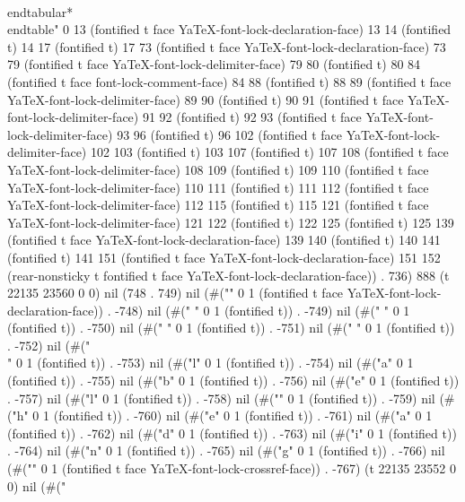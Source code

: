 {   \\end{tabular*}
 \\end{table}" 0 13 (fontified t face YaTeX-font-lock-declaration-face) 13 14 (fontified t) 14 17 (fontified t) 17 73 (fontified t face YaTeX-font-lock-declaration-face) 73 79 (fontified t face YaTeX-font-lock-delimiter-face) 79 80 (fontified t) 80 84 (fontified t face font-lock-comment-face) 84 88 (fontified t) 88 89 (fontified t face YaTeX-font-lock-delimiter-face) 89 90 (fontified t) 90 91 (fontified t face YaTeX-font-lock-delimiter-face) 91 92 (fontified t) 92 93 (fontified t face YaTeX-font-lock-delimiter-face) 93 96 (fontified t) 96 102 (fontified t face YaTeX-font-lock-delimiter-face) 102 103 (fontified t) 103 107 (fontified t) 107 108 (fontified t face YaTeX-font-lock-delimiter-face) 108 109 (fontified t) 109 110 (fontified t face YaTeX-font-lock-delimiter-face) 110 111 (fontified t) 111 112 (fontified t face YaTeX-font-lock-delimiter-face) 112 115 (fontified t) 115 121 (fontified t face YaTeX-font-lock-delimiter-face) 121 122 (fontified t) 122 125 (fontified t) 125 139 (fontified t face YaTeX-font-lock-declaration-face) 139 140 (fontified t) 140 141 (fontified t) 141 151 (fontified t face YaTeX-font-lock-declaration-face) 151 152 (rear-nonsticky t fontified t face YaTeX-font-lock-declaration-face)) . 736) 888 (t 22135 23560 0 0) nil (748 . 749) nil (#("}" 0 1 (fontified t face YaTeX-font-lock-declaration-face)) . -748) nil (#("
" 0 1 (fontified t)) . -749) nil (#(" " 0 1 (fontified t)) . -750) nil (#(" " 0 1 (fontified t)) . -751) nil (#(" " 0 1 (fontified t)) . -752) nil (#("\\" 0 1 (fontified t)) . -753) nil (#("l" 0 1 (fontified t)) . -754) nil (#("a" 0 1 (fontified t)) . -755) nil (#("b" 0 1 (fontified t)) . -756) nil (#("e" 0 1 (fontified t)) . -757) nil (#("l" 0 1 (fontified t)) . -758) nil (#("{" 0 1 (fontified t)) . -759) nil (#("h" 0 1 (fontified t)) . -760) nil (#("e" 0 1 (fontified t)) . -761) nil (#("a" 0 1 (fontified t)) . -762) nil (#("d" 0 1 (fontified t)) . -763) nil (#("i" 0 1 (fontified t)) . -764) nil (#("n" 0 1 (fontified t)) . -765) nil (#("g" 0 1 (fontified t)) . -766) nil (#("}" 0 1 (fontified t face YaTeX-font-lock-crossref-face)) . -767) (t 22135 23552 0 0) nil (#("
